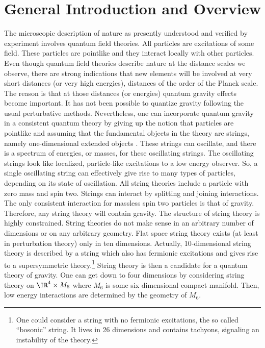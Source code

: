 
\section{General Introduction and Overview}
\label{introduction}

The microscopic description of nature as presently
understood and verified by experiment involves 
quantum field theories. All particles are excitations of 
some field. These particles are pointlike and they 
interact locally with other particles. 
Even though quantum field theories 
 describe nature at the distance scales we observe,
there are strong indications that new
elements will be involved 
 at very short distances (or very high energies), distances
of the order of the
Planck scale. 
The reason is that at those distances (or energies) quantum gravity 
effects become important. It has not been possible to quantize
gravity following the usual perturbative methods. 
Nevertheless, one
 can incorporate quantum gravity in a consistent quantum 
theory by giving up 
the notion that particles are pointlike and assuming that 
the fundamental objects in the theory are strings, namely one-dimensional
extended objects \cite{Green:1987sp,joebook}.
 These strings can oscillate, and there is 
a spectrum of energies, or masses, for these oscillating strings.
The oscillating strings  look like localized, particle-like
excitations to a low energy observer.  
So, a single oscillating string can effectively give rise to many
types of
particles, depending on its state of oscillation. All string theories
include a particle with zero mass and spin two. 
Strings can interact by splitting and joining interactions.
The only consistent interaction for massless spin two 
particles is that  of gravity. Therefore, 
any string theory will contain gravity. 
The structure of string theory is highly constrained. String theories
do not make sense in an arbitrary number of dimensions or on any 
arbitrary geometry. Flat space string theory exists (at least in
perturbation theory) only in 
ten dimensions. Actually, 10-dimensional string theory is described
by a string which also has fermionic excitations and gives rise
to a supersymmetric theory.\footnote{One could consider a  string with no
fermionic excitations, the so called ``bosonic'' string. It  lives in
26 dimensions and contains tachyons, signaling an instability of the
theory.}
String theory is then a candidate for a quantum theory of gravity.
One can get down to four dimensions by considering string theory on 
$\IR^4\times M_6$ where $M_6$ is some six dimensional compact manifold. 
Then, low energy interactions are determined by the geometry
of $M_6$. 

